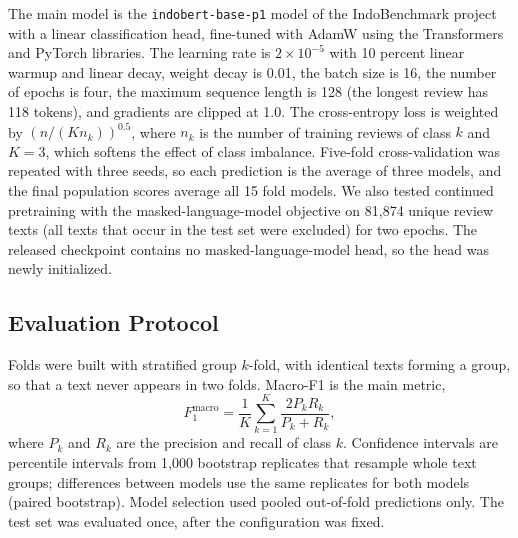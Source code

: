 \documentclass[conference]{IEEEtran}
\begin{document}
The main model is the \texttt{indobert-base-p1} model of the IndoBenchmark project \cite{b4} with a linear classification head, fine-tuned with AdamW \cite{b16} using the Transformers \cite{b17} and PyTorch \cite{b18} libraries. The learning rate is $2\times10^{-5}$ with 10 percent linear warmup and linear decay, weight decay is 0.01, the batch size is 16, the number of epochs is four, the maximum sequence length is 128 (the longest review has 118 tokens), and gradients are clipped at 1.0. The cross-entropy loss is weighted by $(n/(Kn_k))^{0.5}$, where $n_k$ is the number of training reviews of class $k$ and $K=3$, which softens the effect of class imbalance. Five-fold cross-validation was repeated with three seeds, so each prediction is the average of three models, and the final population scores average all 15 fold models. We also tested continued pretraining with the masked-language-model objective on 81,874 unique review texts (all texts that occur in the test set were excluded) for two epochs. The released checkpoint contains no masked-language-model head, so the head was newly initialized.

\subsection{Evaluation Protocol}
Folds were built with stratified group $k$-fold, with identical texts forming a group, so that a text never appears in two folds. Macro-F1 is the main metric,
\begin{equation}
F_{1}^{\text{macro}}=\frac{1}{K}\sum_{k=1}^{K}\frac{2P_kR_k}{P_k+R_k},\label{eq:f1}
\end{equation}
where $P_k$ and $R_k$ are the precision and recall of class $k$. Confidence intervals are percentile intervals from 1,000 bootstrap replicates \cite{b19} that resample whole text groups; differences between models use the same replicates for both models (paired bootstrap). Model selection used pooled out-of-fold predictions only. The test set was evaluated once, after the configuration was fixed.
\end{document}
